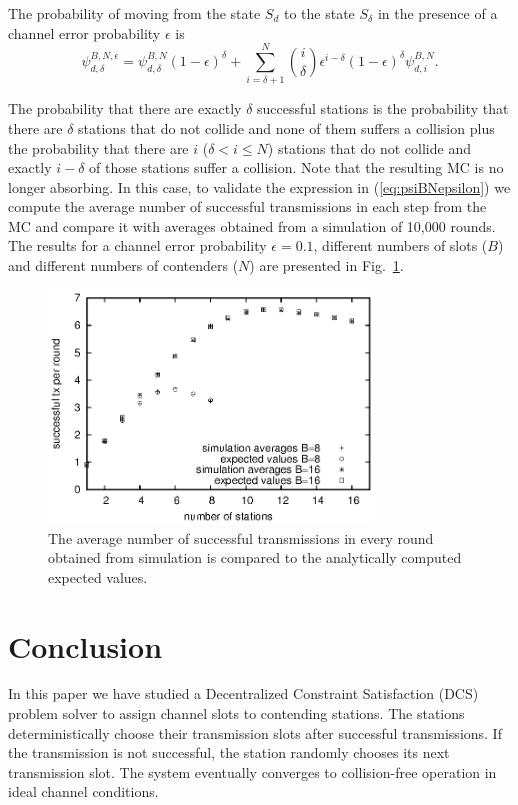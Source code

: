 \documentclass[journal]{IEEEtran}
\begin{document}
The probability of moving from the state $S_d$ to the state $S_\delta$ in the presence of a channel error probability $\epsilon$ is
\begin{equation}
\label{eq:psiBNepsilon}
\psi^{B,N,\epsilon}_{d,\delta}= \psi^{B,N}_{d,\delta} (1-\epsilon)^\delta + \sum_{i=\delta+1}^{N} \binom{i}{\delta} \epsilon^{i-\delta}(1-\epsilon)^\delta \psi^{B,N}_{d,i}.
\end{equation}

The probability that there are exactly $\delta$ successful stations is the probability that there are $\delta$ stations that do not collide and none of them suffers a collision plus the probability that there are $i$ ($\delta < i \leq N$) stations that do not collide and exactly $i-\delta$ of those stations suffer a collision.
Note that the resulting MC is no longer absorbing.
In this case, to validate the expression in (\ref{eq:psiBNepsilon}) we compute the average number of successful transmissions in each step from the MC and compare it with averages obtained from a simulation of 10,000 rounds.
The results for a channel error probability $\epsilon=0.1$, different numbers of slots ($B$) and different numbers of contenders ($N$) are presented in Fig.~\ref{fig:successful_tx_per_step}.

\begin{figure}[h]
\centering
\includegraphics[height=6.2cm]{figures/successful_tx_per_step}
\caption{The average number of successful transmissions in every round obtained from simulation is compared to the analytically computed expected values.}
\label{fig:successful_tx_per_step}
\end{figure}

\section{Conclusion}
\label{sec:conclusion}

In this paper we have studied a Decentralized Constraint Satisfaction (DCS) problem solver to assign channel slots to contending stations.
The stations deterministically choose their transmission slots after successful transmissions.
If the transmission is not successful, the station randomly chooses its next transmission slot.
The system eventually converges to collision-free operation in ideal channel conditions.
\end{document}
